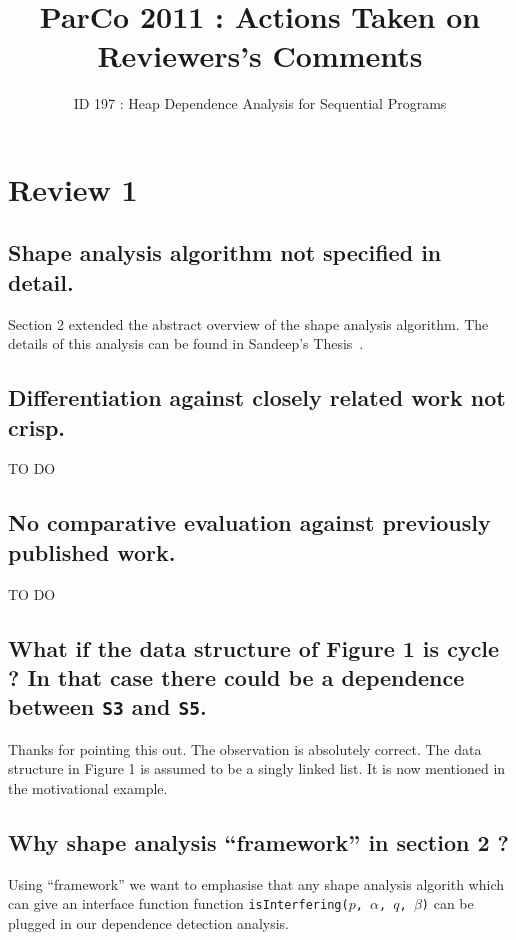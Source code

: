 \documentclass{IOS-Book-Article}
\newcommand{\isInterfering}{\mbox{isInterfering}}
\begin{document}
\begin{frontmatter}                           %

\title{ParCo 2011 : Actions Taken on Reviewers's Comments} 
\subtitle{ID 197 : Heap Dependence Analysis for Sequential Programs}
%
\end{frontmatter}

\section{Review 1}
\subsection{Shape analysis algorithm not specified in
  detail.}  Section 2 extended the abstract overview of the
shape analysis algorithm.  The details of this analysis can
be found in Sandeep's Thesis~\cite{Sandeep11thesis}.

\subsection{Differentiation against closely related work not
  crisp.} 
{\red TO DO}

\subsection{No comparative evaluation against previously
  published work.} 
{\red TO DO}

\subsection{What if the data structure of Figure 1 is cycle ?
  In that case there could be a dependence between {\tt S3}
  and {\tt S5}.}  Thanks for pointing this out. The
observation is absolutely correct.  The data structure in
Figure 1 is assumed to be a singly linked list. It is now
mentioned in the motivational example.

\subsection{Why shape analysis ``framework'' in section 2 ?}
Using ``framework'' we want to emphasise that any shape
analysis algorith which can give an interface function
function {\tt \isInterfering($p$, $\alpha$, $q$, $\beta$)}
can be plugged in our dependence detection analysis.
\end{document}
